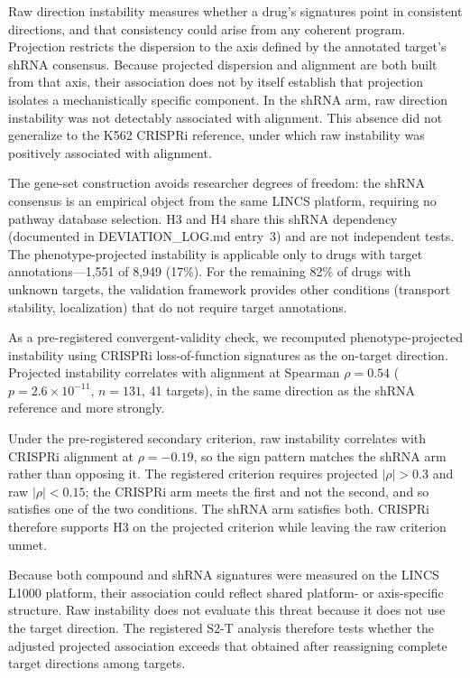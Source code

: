 \documentclass[11pt]{article}
\begin{document}
Raw direction instability measures whether a drug's signatures point in
consistent directions, and that consistency could arise from any coherent
program. Projection restricts the dispersion to the axis defined by the
annotated target's shRNA consensus. Because projected dispersion and alignment
are both built from that axis, their association does not by itself establish
that projection isolates a mechanistically specific component. In the shRNA arm,
raw direction instability was not detectably associated with alignment. This
absence did not generalize to the K562 CRISPRi reference, under which raw
instability was positively associated with alignment.

The gene-set construction avoids researcher degrees of freedom: the shRNA
consensus is an empirical object from the same LINCS platform,
requiring no pathway database selection. H3 and H4 share this shRNA
dependency (documented in DEVIATION\_LOG.md entry~3) and are not
independent tests. The phenotype-projected instability is applicable only
to drugs with target annotations---1{,}551 of 8{,}949 (17\%). For the
remaining 82\% of drugs with unknown targets, the validation framework
provides other conditions (transport stability, localization) that do not
require target annotations.

As a pre-registered convergent-validity check, we recomputed
phenotype-projected instability using CRISPRi loss-of-function signatures
\citep{replogle2022mapping} as the on-target direction. Projected
instability correlates with alignment at Spearman $\rho = 0.54$
($p = 2.6 \times 10^{-11}$, $n = 131$, 41 targets), in the same direction
as the shRNA reference and more strongly.

Under the pre-registered secondary criterion, raw instability correlates
with CRISPRi alignment at $\rho = -0.19$, so the sign pattern matches the
shRNA arm rather than opposing it. The registered criterion requires
projected $|\rho| > 0.3$ and raw $|\rho| < 0.15$; the CRISPRi arm meets
the first and not the second, and so satisfies one of the two conditions.
The shRNA arm satisfies both. CRISPRi therefore supports H3 on the projected
criterion while leaving the raw criterion unmet.

Because both compound and shRNA signatures were measured on the LINCS L1000
platform, their association could reflect shared platform- or axis-specific
structure. Raw instability does not evaluate this threat because it does not use
the target direction. The registered S2-T analysis therefore tests whether the
adjusted projected association exceeds that obtained after reassigning complete
target directions among targets.
\end{document}
